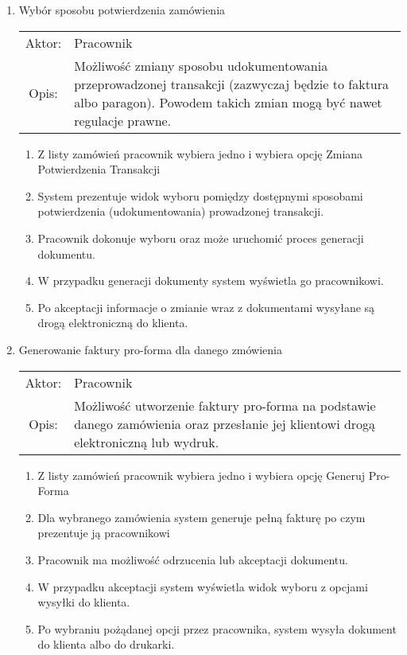 \begin{enumerate}
  \item Wybór sposobu potwierdzenia zamówienia\\
  \begin{tabularx}{\linewidth}{c X}
  Aktor: & Pracownik \\
  Opis: & Możliwość zmiany sposobu udokumentowania przeprowadzonej transakcji
  (zazwyczaj będzie to faktura albo paragon). Powodem takich zmian mogą być
  nawet regulacje prawne.
  \end{tabularx}	
	\begin{enumerate}
	  \item Z listy zamówień pracownik wybiera jedno i wybiera opcję Zmiana
	  Potwierdzenia Transakcji
	  \item System prezentuje widok wyboru pomiędzy dostępnymi sposobami
	  potwierdzenia (udokumentowania) prowadzonej transakcji.
	  \item Pracownik dokonuje wyboru oraz może uruchomić proces generacji
	  dokumentu.
	  \item W przypadku generacji dokumenty system wyświetla go pracownikowi.
	  \item Po akceptacji informacje o zmianie wraz z dokumentami wysyłane są drogą
	  elektroniczną do klienta.
	\end{enumerate}

  \item Generowanie faktury pro-forma dla danego zmówienia\\
  \begin{tabularx}{\linewidth}{c X}
  Aktor: & Pracownik \\
  Opis: & Możliwość utworzenie faktury pro-forma na podstawie danego zamówienia
  oraz przesłanie jej klientowi drogą elektroniczną lub wydruk.
  \end{tabularx}
	\begin{enumerate}
	  \item Z listy zamówień pracownik wybiera jedno i wybiera opcję Generuj
	  Pro-Forma
	  \item Dla wybranego zamówienia system generuje pełną fakturę po czym
	  prezentuje ją pracownikowi
	  \item Pracownik ma możliwość odrzucenia lub akceptacji dokumentu.
	  \item W przypadku akceptacji system wyświetla widok wyboru z opcjami wysyłki
	  do klienta.
	  \item Po wybraniu pożądanej opcji przez pracownika, system wysyła dokument do
	  klienta albo do drukarki.
	\end{enumerate}


\end{enumerate}
